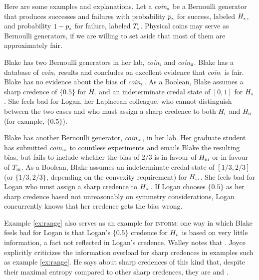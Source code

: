 \documentclass[11pt]{article}
\begin{document}
Here are some examples and explanations. Let a
\textit{coin}$_{\mbox{\tiny{x}}}$ be a Bernoulli generator that
produces successes and failures with probability $p_{\mbox{\tiny{x}}}$
for success, labeled $H_{\mbox{\tiny{x}}}$, and probability
$1-p_{\mbox{\tiny{x}}}$ for failure, labeled $T_{\mbox{\tiny{x}}}$.
Physical coins may serve as Bernoulli generators, if we are willing to
set aside that most of them are approximately fair.

\begin{quotex}
  \label{ex:range} Blake has two Bernoulli generators
  in her lab, \textit{coin}$_{\mbox{\tiny{i}}}$ and
  \textit{coin}$_{\mbox{\tiny{ii}}}$. Blake has a database of
  \textit{coin}$_{\mbox{\tiny{i}}}$ results and concludes on excellent
  evidence that \textit{coin}$_{\mbox{\tiny{i}}}$ is fair. Blake has
  no evidence about the bias of \textit{coin}$_{\mbox{\tiny{ii}}}$. As
  a Boolean, Blake assumes a sharp credence of $\{0.5\}$ for
  $H_{\mbox{\tiny{i}}}$ and an indeterminate credal state of $[0,1]$
  for $H_{\mbox{\tiny{ii}}}$. She feels bad for Logan, her Laplacean
  colleague, who cannot distinguish between the two cases and who must
  assign a sharp credence to both $H_{\mbox{\tiny{i}}}$ and
  $H_{\mbox{\tiny{ii}}}$ (for example, $\{0.5\}$).
\end{quotex}

\begin{quotex}
  \label{ex:incomp} Blake has another Bernoulli
  generator, \textit{coin}$_{\mbox{\tiny{iii}}}$, in her lab. Her
  graduate student has submitted \textit{coin}$_{\mbox{\tiny{iii}}}$
  to countless experiments and emails Blake the resulting bias, but
  fails to include whether the bias of $2/3$ is in favour of
  $H_{\mbox{\tiny{iii}}}$ or in favour of $T_{\mbox{\tiny{iii}}}$. As
  a Boolean, Blake assumes an indeterminate credal state of
  $[1/3,2/3]$ (or $\{1/3,2/3\}$, depending on the convexity
  requirement) for $H_{\mbox{\tiny{iii}}}$. She feels bad for Logan
  who must assign a sharp credence to $H_{\mbox{\tiny{iii}}}$. If
  Logan chooses $\{0.5\}$ as her sharp credence based not unreasonably
  on symmetry considerations, Logan concurrently knows that her
  credence gets the bias wrong.
\end{quotex}

Example \ref{ex:range} also serves as an example for \textsc{inform}:
one way in which Blake feels bad for Logan is that Logan's $\{0.5\}$
credence for $H_{\mbox{\tiny{ii}}}$ is based on very little
information, a fact not reflected in Logan's credence. Walley notes
that 
. Joyce explicitly criticizes the information
overload for sharp credences in examples such as example
\ref{ex:range}. He says about sharp credences of this kind that,
despite their maximal entropy compared to other sharp credences, they
are  and  .
\end{document}
